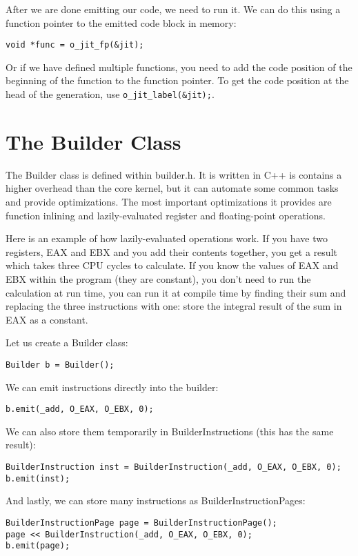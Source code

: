 \documentclass[10pt,a4paper]{article}
\begin{document}
After we are done emitting our code, we need to run it. We can do this using a function pointer to the emitted code block in memory:
\begin{verbatim}
void *func = o_jit_fp(&jit);
\end{verbatim}

Or if we have defined multiple functions, you need to add the code position of the beginning of the function to the function pointer. To get the code position at the head of the generation, use \verb|o_jit_label(&jit);|.

\section{The Builder Class}
The Builder class is defined within builder.h. It is written in C++ is contains a higher overhead than the core kernel, but it can automate some common tasks and provide optimizations. The most important optimizations it provides are function inlining and lazily-evaluated register and floating-point operations. 

Here is an example of how lazily-evaluated operations work. If you have two registers, EAX and EBX and you add their contents together, you get a result which takes three CPU cycles to calculate. If you know the values of EAX and EBX within the program (they are constant), you don't need to run the calculation at run time, you can run it at compile time by finding their sum and replacing the three instructions with one: store the integral result of the sum in EAX as a constant.

Let us create a Builder class:
\begin{verbatim}
Builder b = Builder();
\end{verbatim}

We can emit instructions directly into the builder:
\begin{verbatim}
b.emit(_add, O_EAX, O_EBX, 0);
\end{verbatim}

We can also store them temporarily in BuilderInstructions (this has the same result):
\begin{verbatim}
BuilderInstruction inst = BuilderInstruction(_add, O_EAX, O_EBX, 0);
b.emit(inst);
\end{verbatim}

And lastly, we can store many instructions as BuilderInstructionPages:
\begin{verbatim}
BuilderInstructionPage page = BuilderInstructionPage();
page << BuilderInstruction(_add, O_EAX, O_EBX, 0);
b.emit(page);
\end{verbatim}
\end{document}
